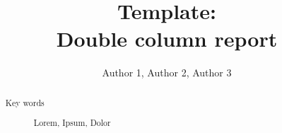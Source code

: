 
\title{Template:\\ Double column report}

\author{Author 1, Author 2, Author 3}


\begin{abstract}
\lipsum[1]

\vspace{5pt}
\begin{description}
\item[Key words]
Lorem, Ipsum, Dolor
\end{description}
\end{abstract}

\maketitle